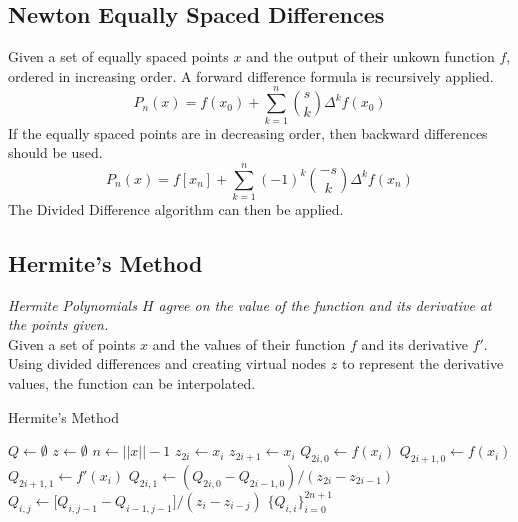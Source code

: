 \documentclass[12pt]{article}
\numberwithin{equation}{subsection}
\begin{document}
        \subsection{Newton Equally Spaced Differences}

            Given a set of equally spaced points $x$ and the output of their
            unkown function $f$, ordered in increasing order. A forward
            difference formula is recursively applied.
            $$P_n(x) = f(x_0) + \sum_{k=1}^n {s \choose k } \Delta^k f(x_0)$$
            If the equally spaced points are in decreasing order, then backward
            differences should be used.
            $$P_n(x) = f[x_n] + \sum_{k=1}^n (-1)^k {-s \choose k } \Delta^k f(x_n)$$
            The Divided Difference algorithm can then be applied.

        \subsection{Hermite's Method}

            \textit{Hermite Polynomials $H$ agree on the value of the function and
            its derivative at the points given.}\\

            Given a set of points $x$ and the values of their function $f$ and
            its derivative $f'$. Using divided differences and creating virtual
            nodes $z$ to represent the derivative values, the function can be
            interpolated.

            \begin{center}
            \begin{algorithm}[H]
                \caption{Hermite's Method}
                \begin{algorithmic}[1]
                    \State $Q \gets \emptyset$
                    \State $z \gets \emptyset$
                    \State $n \gets ||x|| - 1$
                        \State $z_{2i} \gets x_i$
                        \State $z_{2i+1} \gets x_i$
                        \State $Q_{2i,0} \gets f(x_i)$
                        \State $Q_{2i+1,0} \gets f(x_i)$
                        \State $Q_{2i+1,1} \gets f'(x_i)$
                            \State $Q_{2i,1} \gets (Q_{2i,0}-Q_{2i-1,0})/(z_{2i}-z_{2i-1})$
                        \EndIf
                    \EndFor
                            \State $Q_{i,j} \gets \big[Q_{i,j-1}-Q_{i-1,j-1}\big]/(z_i - z_{i-j}) $
                        \EndFor
                    \EndFor
                    \State \Return $\{Q_{i,i}\}_{i=0}^{2n+1}$
                    \EndProcedure
                \end{algorithmic}
            \end{algorithm}
            \end{center}
\end{document}
